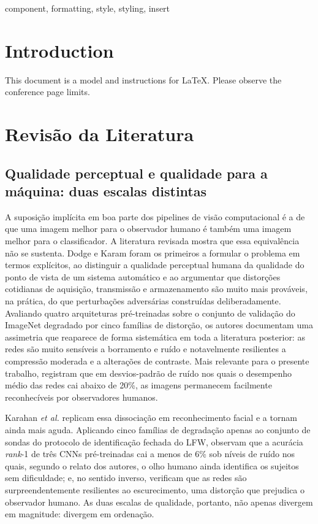 \documentclass[conference]{IEEEtran}
\begin{document}
\begin{IEEEkeywords}
component, formatting, style, styling, insert
\end{IEEEkeywords}

\section{Introduction}
This document is a model and instructions for \LaTeX.
Please observe the conference page limits. 

\section{Revisão da Literatura}

\subsection{Qualidade perceptual e qualidade para a máquina: duas escalas
distintas}

A suposição implícita em boa parte dos pipelines de visão computacional é a de
que uma imagem melhor para o observador humano é também uma imagem melhor para
o classificador. A literatura revisada mostra que essa equivalência não se
sustenta. Dodge e Karam \cite{b1} foram os primeiros a formular o problema em
termos explícitos, ao distinguir a qualidade perceptual humana da qualidade do
ponto de vista de um sistema automático e ao argumentar que distorções
cotidianas de aquisição, transmissão e armazenamento são muito mais prováveis,
na prática, do que perturbações adversárias construídas deliberadamente.
Avaliando quatro arquiteturas pré-treinadas sobre o conjunto de validação do
ImageNet degradado por cinco famílias de distorção, os autores documentam uma
assimetria que reaparece de forma sistemática em toda a literatura posterior:
as redes são muito sensíveis a borramento e ruído e notavelmente resilientes a
compressão moderada e a alterações de contraste. Mais relevante para o presente
trabalho, registram que em desvios-padrão de ruído nos quais o desempenho médio
das redes cai abaixo de 20\%, as imagens permanecem facilmente reconhecíveis
por observadores humanos.

Karahan \textit{et al.} \cite{b2} replicam essa dissociação em reconhecimento
facial e a tornam ainda mais aguda. Aplicando cinco famílias de degradação
apenas ao conjunto de sondas do protocolo de identificação fechada do LFW,
observam que a acurácia \textit{rank}-1 de três CNNs pré-treinadas cai a menos
de 6\% sob níveis de ruído nos quais, segundo o relato dos autores, o olho
humano ainda identifica os sujeitos sem dificuldade; e, no sentido inverso,
verificam que as redes são surpreendentemente resilientes ao escurecimento, uma
distorção que prejudica o observador humano. As duas escalas de qualidade,
portanto, não apenas divergem em magnitude: divergem em ordenação.
\end{document}
